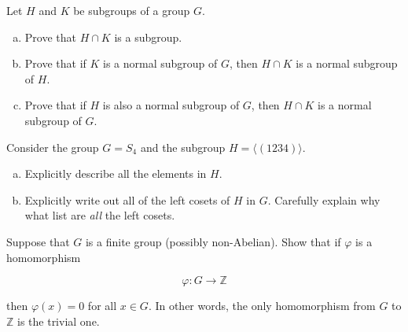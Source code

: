\documentclass[11pt]{exam}
\theoremstyle{definition}
\begin{document}
\begin{questions}
\newpage
\question[10]\mbox{}
Let $H$ and $K$ be subgroups of a group $G$.
\begin{enumerate}[(a)]
\item Prove that $H\cap K$ is a subgroup.
\vspace{2in}
\item Prove that if $K$ is a normal subgroup of $G$, then $H\cap K$ is a normal subgroup of $H$.
\vspace{3in}
\item Prove that if $H$ is also a normal subgroup of $G$, then $H\cap K$ is a normal subgroup of $G$.
\end{enumerate}

\newpage
\question[10]\mbox{}
Consider the group $G=S_4$ and the subgroup $H=\langle (1234)\rangle$.
\begin{enumerate}[(a)]
\item Explicitly describe all the elements in $H$.
\vspace{2in}
\item Explicitly write out all of the left cosets of $H$ in $G$.  Carefully explain why what list are \emph{all} the left cosets.
\end{enumerate}

\newpage
\question[10]\mbox{}

Suppose that $G$ is a finite group (possibly non-Abelian).  Show that if $\varphi$ is a homomorphism

$$\varphi: G\rightarrow\mathbb Z$$

then $\varphi(x) = 0$ for all $x\in G$.  In other words, the only homomorphism from $G$ to $\mathbb Z$ is the trivial one.


\end{questions}
\end{document}
